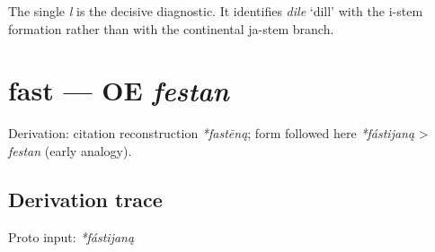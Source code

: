 \documentclass[
  british,
  a4paper,
  openany]{book}
\providecommand{\texorpdfstring}[2]{#1}
\begin{document}
The single \emph{l} is the decisive diagnostic. It identifies
{\emph{dile}} `dill' with the i-stem formation rather than with the
continental ja-stem branch.

\section{\texorpdfstring{fast --- OE
\emph{festan}}{fast --- OE festan}}\label{fast-oe-festan}


Derivation: citation reconstruction \emph{*fastēną}; form followed here
\emph{*fástijaną} \textgreater{} \emph{festan} (early analogy).

\subsection{Derivation trace}\label{derivation-trace-79}

Proto input: \emph{*fástijaną}

\begingroup
\setlength{\fboxsep}{6pt}
\end{document}
